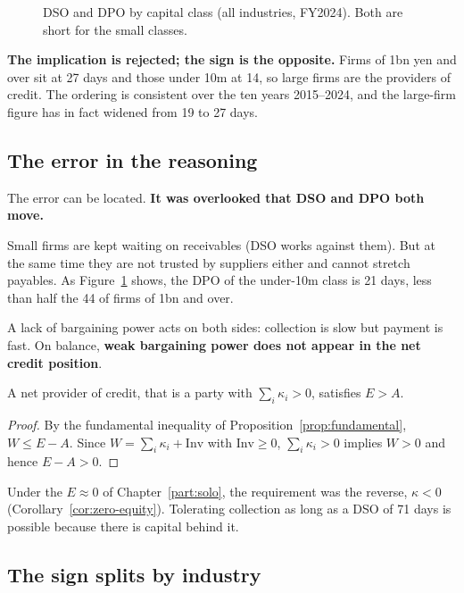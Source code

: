 \begin{figure}[htbp]
\centering
{}
\caption{DSO and DPO by capital class (all industries, FY2024). Both are short for the small classes.}
\label{fig:size-dso-dpo}
\end{figure}

\textbf{The implication is rejected; the sign is the opposite.} Firms of 1bn yen and over sit
at 27 days and those under 10m at 14, so large firms are the providers of credit. The ordering
is consistent over the ten years 2015--2024, and the large-firm figure has in fact widened
from 19 to 27 days.

\subsection{The error in the reasoning}

The error can be located. \textbf{It was overlooked that DSO and DPO both move.}

Small firms are kept waiting on receivables (DSO works against them). But at the same time
they are not trusted by suppliers either and cannot stretch payables. As
Figure~\ref{fig:size-dso-dpo} shows, the DPO of the under-10m class is 21 days, less than half
the 44 of firms of 1bn and over.

A lack of bargaining power acts on both sides: collection is slow but payment is fast. On
balance, \textbf{weak bargaining power does not appear in the net credit position}.

\begin{proposition}
\label{prop:credit-needs-equity}
A net provider of credit, that is a party with $\sum_i\kappa_i>0$, satisfies $E > A$.
\end{proposition}

\begin{proof}
By the fundamental inequality of Proposition~\ref{prop:fundamental}, $W\leq E-A$. Since
$W=\sum_i\kappa_i+\mathrm{Inv}$ with $\mathrm{Inv}\geq 0$, $\sum_i\kappa_i>0$ implies $W>0$
and hence $E-A>0$.
\end{proof}

Under the $E\approx 0$ of Chapter~\ref{part:solo}, the requirement was the reverse,
$\kappa<0$ (Corollary~\ref{cor:zero-equity}). Tolerating collection as long as a DSO of 71
days is possible because there is capital behind it.

\subsection{The sign splits by industry}

